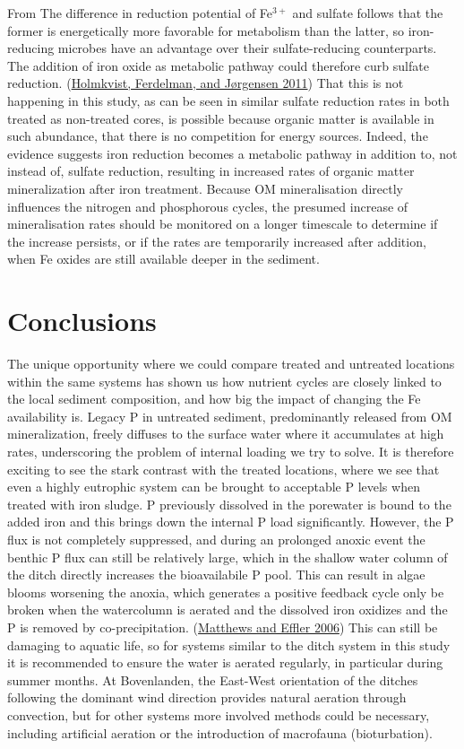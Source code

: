 \documentclass[a4paper,11pt]{article}
\begin{document}
From The difference in reduction potential of Fe\(^{3+}\) and sulfate follows that the former is energetically more favorable for metabolism than the latter, so iron-reducing microbes have an advantage over their sulfate-reducing counterparts. The addition of iron oxide as metabolic pathway could therefore curb sulfate reduction. (\protect\hyperlink{ref-holmkvistHolmkvistFerdelmanTG2011}{Holmkvist, Ferdelman, and Jørgensen 2011}) That this is not happening in this study, as can be seen in similar sulfate reduction rates in both treated as non-treated cores, is possible because organic matter is available in such abundance, that there is no competition for energy sources. Indeed, the evidence suggests iron reduction becomes a metabolic pathway in addition to, not instead of, sulfate reduction, resulting in increased rates of organic matter mineralization after iron treatment. Because OM mineralisation directly influences the nitrogen and phosphorous cycles, the presumed increase of mineralisation rates should be monitored on a longer timescale to determine if the increase persists, or if the rates are temporarily increased after addition, when Fe oxides are still available deeper in the sediment.

\hypertarget{conclusions}{%
\section{Conclusions}\label{conclusions}}

The unique opportunity where we could compare treated and untreated locations within the same systems has shown us how nutrient cycles are closely linked to the local sediment composition, and how big the impact of changing the Fe availability is. Legacy P in untreated sediment, predominantly released from OM mineralization, freely diffuses to the surface water where it accumulates at high rates, underscoring the problem of internal loading we try to solve. It is therefore exciting to see the stark contrast with the treated locations, where we see that even a highly eutrophic system can be brought to acceptable P levels when treated with iron sludge. P previously dissolved in the porewater is bound to the added iron and this brings down the internal P load significantly. However, the P flux is not completely suppressed, and during an prolonged anoxic event the benthic P flux can still be relatively large, which in the shallow water column of the ditch directly increases the bioavailabile P pool. This can result in algae blooms worsening the anoxia, which generates a positive feedback cycle only be broken when the watercolumn is aerated and the dissolved iron oxidizes and the P is removed by co-precipitation. (\protect\hyperlink{ref-matthewsLongTermChanges2006}{Matthews and Effler 2006}) This can still be damaging to aquatic life, so for systems similar to the ditch system in this study it is recommended to ensure the water is aerated regularly, in particular during summer months. At Bovenlanden, the East-West orientation of the ditches following the dominant wind direction provides natural aeration through convection, but for other systems more involved methods could be necessary, including artificial aeration or the introduction of macrofauna (bioturbation).
\end{document}
